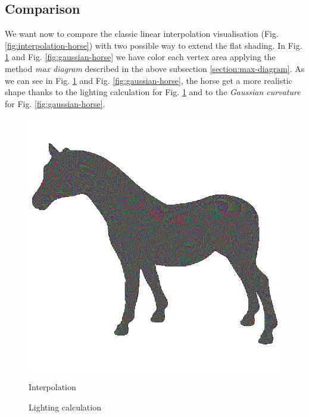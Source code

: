 \subsection{Comparison}
We want now to compare the classic linear interpolation visualisation (Fig. \ref{fig:interpolation-horse}) with two possible way to extend the flat shading. In Fig. \ref{fig:lighting-horse} and Fig. \ref{fig:gaussian-horse} we have color each vertex area applying the method \textit{max diagram} described in the above subsection \ref{section:max-diagram}.
As we can see in Fig. \ref{fig:lighting-horse} and Fig. \ref{fig:gaussian-horse}, the horse get a more realistic shape thanks to the lighting calculation for Fig. \ref{fig:lighting-horse} and to the \textit{Gaussian curvature} for Fig. \ref{fig:gaussian-horse}.
\begin{figure}[!htb]
    \includegraphics[width=\linewidth]{images/linear-horse.png}
    \caption{Interpolation}\label{fig:interpolation-horse}
  \endminipage\hfill
    \caption{Lighting calculation}\label{fig:lighting-horse}
  \endminipage\hfill

\end{figure}
